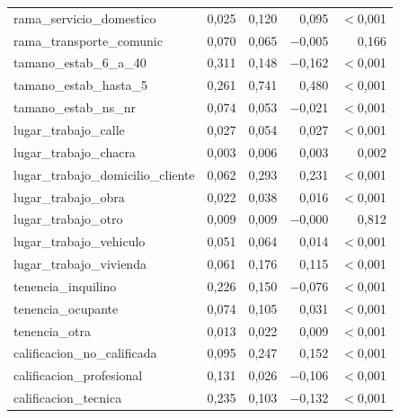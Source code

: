 \begin{longtable}{lrrrr}
rama\_servicio\_domestico & 0,025 & 0,120 & 0,095 & $<$0,001 \\
rama\_transporte\_comunic & 0,070 & 0,065 & $-$0,005 & 0,166 \\
tamano\_estab\_6\_a\_40 & 0,311 & 0,148 & $-$0,162 & $<$0,001 \\
tamano\_estab\_hasta\_5 & 0,261 & 0,741 & 0,480 & $<$0,001 \\
tamano\_estab\_ns\_nr & 0,074 & 0,053 & $-$0,021 & $<$0,001 \\
lugar\_trabajo\_calle & 0,027 & 0,054 & 0,027 & $<$0,001 \\
lugar\_trabajo\_chacra & 0,003 & 0,006 & 0,003 & 0,002 \\
lugar\_trabajo\_domicilio\_cliente & 0,062 & 0,293 & 0,231 & $<$0,001 \\
lugar\_trabajo\_obra & 0,022 & 0,038 & 0,016 & $<$0,001 \\
lugar\_trabajo\_otro & 0,009 & 0,009 & $-$0,000 & 0,812 \\
lugar\_trabajo\_vehiculo & 0,051 & 0,064 & 0,014 & $<$0,001 \\
lugar\_trabajo\_vivienda & 0,061 & 0,176 & 0,115 & $<$0,001 \\
tenencia\_inquilino & 0,226 & 0,150 & $-$0,076 & $<$0,001 \\
tenencia\_ocupante & 0,074 & 0,105 & 0,031 & $<$0,001 \\
tenencia\_otra & 0,013 & 0,022 & 0,009 & $<$0,001 \\
calificacion\_no\_calificada & 0,095 & 0,247 & 0,152 & $<$0,001 \\
calificacion\_profesional & 0,131 & 0,026 & $-$0,106 & $<$0,001 \\
calificacion\_tecnica & 0,235 & 0,103 & $-$0,132 & $<$0,001 \\
\end{longtable}